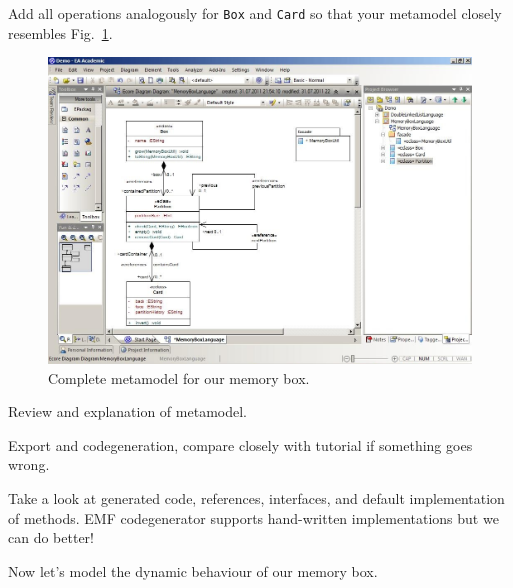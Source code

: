\clearpage

Add all operations analogously for \texttt{Box} and \texttt{Card} so that your
metamodel closely resembles Fig.~\ref{fig:metamodel_complete}.
 
\begin{figure}[htbp]
	\centering
  \includegraphics[width=\textwidth]{pics/memBox44.png}
	\caption{Complete metamodel for our memory box.}
	\label{fig:metamodel_complete}
\end{figure}

Review and explanation of metamodel.

Export and codegeneration, compare closely with tutorial if something goes
wrong.

Take a look at generated code, references, interfaces, and default
implementation of methods.  EMF codegenerator supports hand-written
implementations but we can do better!

Now let's model the dynamic behaviour of our memory box.
